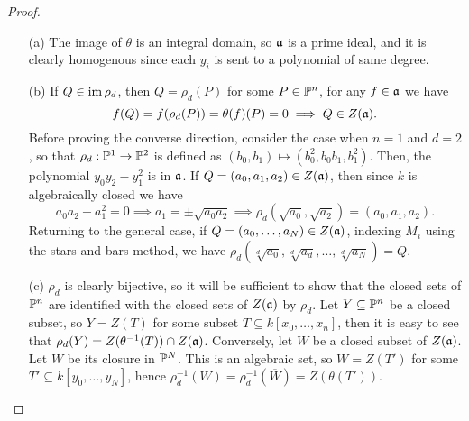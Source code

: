 \documentclass{article}
\begin{document}
\begin{enumerate} [label=\textbf{\arabic*.}, leftmargin=0cm]
\begin{proof} $ $ \vspace{0pt}
    \begin{itemize} [leftmargin=0cm]
        \item[(a)] The image of $\theta$ is an integral domain, so $\mathfrak{a}$ is a prime ideal, and it is clearly homogenous since each $y_i$ is sent to a polynomial of same degree.

        \item[(b)] If $Q \in \operatorname{im}{\rho_d}$, then $Q = \rho_d(P)$ for some $P \in \mathbb{P}^n$, for any $f \in \mathfrak{a}$ we have
        \begin{equation*}
            f(Q) = f(\rho_d(P)) = \theta(f)(P) = 0 \implies Q \in Z(\mathfrak{a}).
        \end{equation*}
        Before proving the converse direction, consider the case when $n = 1$ and $d = 2$, so that $\rho_d : \mathbb{P}^1 \to \mathbb{P}^2$ is defined as $(b_0, b_1) \mapsto (b_0^2, b_0 b_1, b_1^2)$. Then, the polynomial $y_0 y_2 - y_1^2$ is in $\mathfrak{a}$. If $Q = (a_0, a_1, a_2) \in Z(\mathfrak{a})$, then since $k$ is algebraically closed we have
        \begin{equation*}
            a_0 a_2 - a_1^2 = 0 \implies a_1 = \pm \sqrt{a_0 a_2} \implies \rho_d(\sqrt{a_0}, \sqrt{a_2}) = (a_0, a_1, a_2).
        \end{equation*}
        Returning to the general case, if $Q = (a_0, \dots, a_N) \in Z(\mathfrak{a})$, indexing $M_i$ using the stars and bars method, we have $\rho_d(\sqrt[d]{a_0}, \sqrt[d]{a_d}, \dots, \sqrt[d]{a_N}) = Q$.

        \item[(c)] $\rho_d$ is clearly bijective, so it will be sufficient to show that the closed sets of $\mathbb{P}^n$ are identified with the closed sets of $Z(\mathfrak{a})$ by $\rho_d$. Let $Y \subseteq \mathbb{P}^n$ be a closed subset, so $Y = Z(T)$ for some subset $T \subseteq k[x_0, \dots, x_n]$, then it is easy to see that $\rho_d(Y) = Z(\theta^{-1}(T)) \cap Z(\mathfrak{a})$. Conversely, let $W$ be a closed subset of $Z(\mathfrak{a})$. Let $\overline{W}$ be its closure in $\mathbb{P}^N$. This is an algebraic set, so $\overline{W} = Z(T')$ for some $T' \subseteq k[y_0, \dots, y_N]$, hence $\rho_d^{-1}(W) = \rho_d^{-1}(\overline{W}) = Z(\theta(T'))$.


\end{itemize}
\end{proof}
\end{enumerate}
\end{document}
